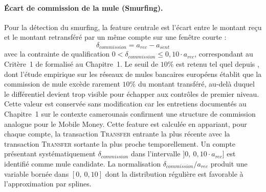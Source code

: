 \documentclass[11pt,a4paper,oneside]{report}
\theoremstyle{definition}
\theoremstyle{remark}
\begin{document}
\paragraph{Écart de commission de la mule (Smurfing).}
Pour la détection du smurfing, la feature centrale est l'écart entre le montant reçu et le montant retransféré par un même compte sur une fenêtre courte :
\begin{equation}
    \delta_{commission} = a_{rec} - a_{sent}
\end{equation}
avec la contrainte de qualification $0 < \delta_{commission} \leq 0{,}10 \cdot a_{rec}$, correspondant au Critère~1 de \citet{zhdanova2014smurfs} formalisé au Chapitre~1. Le seuil de $10\%$ est retenu tel quel depuis \citet{zhdanova2014smurfs}, dont l'étude empirique sur les réseaux de mules bancaires européens établit que la commission de mule excède rarement $10\%$ du montant transféré, au-delà duquel le différentiel devient trop visible pour échapper aux contrôles de premier niveau. Cette valeur est conservée sans modification car les entretiens documentés au Chapitre~1 sur le contexte camerounais confirment une structure de commission analogue pour le Mobile Money. Cette feature est calculée en appariant, pour chaque compte, la transaction \textsc{Transfer} entrante la plus récente avec la transaction \textsc{Transfer} sortante la plus proche temporellement. Un compte présentant systématiquement $\delta_{commission}$ dans l'intervalle $]0,\ 0{,}10 \cdot a_{rec}]$ est identifié comme mule candidate. La normalisation $\delta_{commission} / a_{rec}$ produit une variable bornée dans $[0,\ 0{,}10]$ dont la distribution régulière est favorable à l'approximation par splines.
\end{document}
